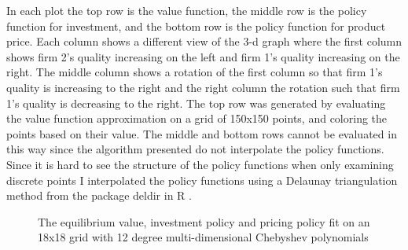 \documentclass[12pt]{article}
\begin{document}
In each plot the top row is the value function, the middle row is the policy function for investment, and the bottom row is the policy function for product price. Each column shows a different view of the 3-d graph where the first column shows firm 2's quality increasing on the left and firm 1's quality increasing on the right. The middle column shows a rotation of the first column so that firm 1's quality is increasing to the right and the right column the rotation such that firm 1's quality is decreasing to the right. The top row was generated by evaluating the value function approximation on a grid of 150x150 points, and coloring the points based on their value. The middle and bottom rows cannot be evaluated in this way since the algorithm presented do not interpolate the policy functions. Since it is hard to see the structure of the policy functions when only examining discrete points I interpolated the policy functions using a Delaunay triangulation method from the package deldir in R \citep{deldir}.

\begin{figure}[H]
  \centering
  \caption{The equilibrium value, investment policy and pricing policy fit on an 18x18 grid with 12 degree multi-dimensional Chebyshev polynomials}
\end{figure}
\end{document}
